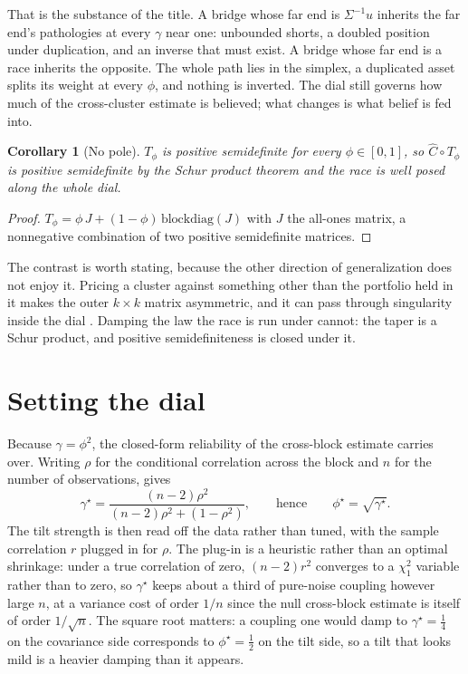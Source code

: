 \documentclass[11pt]{article}
\newtheorem{corollary}{Corollary}
\begin{document}
That is the substance of the title. A bridge whose far end is $\Sigma^{-1}u$
inherits the far end's pathologies at every $\gamma$ near one: unbounded shorts,
a doubled position under duplication, and an inverse that must exist. A bridge
whose far end is a race inherits the opposite. The whole path lies in the
simplex, a duplicated asset splits its weight at every $\phi$, and nothing is
inverted. The dial still governs how much of the cross-cluster estimate is
believed; what changes is what belief is fed into.

\begin{corollary}[No pole]
\label{cor:nopole}
$T_\phi$ is positive semidefinite for every $\phi\in[0,1]$, so
$\widehat C\circ T_\phi$ is positive semidefinite by the Schur product theorem
and the race is well posed along the whole dial.
\end{corollary}

\begin{proof}
$T_\phi=\phi\,J+(1-\phi)\,\mathrm{blockdiag}(J)$ with $J$ the all-ones matrix,
a nonnegative combination of two positive semidefinite matrices.
\end{proof}

The contrast is worth stating, because the other direction of generalization
does not enjoy it. Pricing a cluster against something other than the portfolio
held in it makes the outer $k\times k$ matrix asymmetric, and it can pass
through singularity inside the dial \cite{cotton2026pricing}. Damping the law
the race is run under cannot: the taper is a Schur product, and positive
semidefiniteness is closed under it.

\section{Setting the dial}

Because $\gamma=\phi^2$, the closed-form reliability of the cross-block estimate
carries over. Writing $\rho$ for the conditional correlation across the block
and $n$ for the number of observations, \cite{cotton2026twosides} gives
\begin{equation}
  \gamma^\star=\frac{(n-2)\rho^2}{(n-2)\rho^2+(1-\rho^2)},
  \qquad\text{hence}\qquad
  \phi^\star=\sqrt{\gamma^\star}.
  \label{eq:phistar}
\end{equation}
The tilt strength is then read off the data rather than tuned, with the sample
correlation $r$ plugged in for $\rho$. The plug-in is a heuristic rather than
an optimal shrinkage: under a true correlation of zero, $(n-2)r^2$ converges to
a $\chi^2_1$ variable rather than to zero, so $\gamma^\star$ keeps about a third
of pure-noise coupling however large $n$, at a variance cost of order $1/n$
since the null cross-block estimate is itself of order $1/\sqrt n$. The square
root matters: a coupling one would damp to $\gamma^\star=\tfrac14$ on the covariance
side corresponds to $\phi^\star=\tfrac12$ on the tilt side, so a tilt that looks
mild is a heavier damping than it appears.
\end{document}
